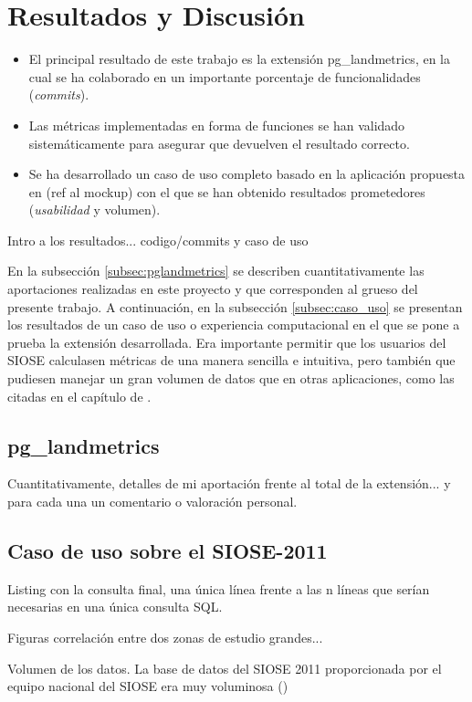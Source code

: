 \chapter{Resultados y Discusión}\label{chap:result}

\begin{graybox}
\begin{itemize}
\item El principal resultado de este trabajo es la extensión pg\_landmetrics, en la cual se ha colaborado en un importante porcentaje de funcionalidades (\textit{commits}).
\item Las métricas implementadas en forma de funciones se han validado sistemáticamente para asegurar que devuelven el resultado correcto.
\item Se ha desarrollado un caso de uso completo basado en la aplicación propuesta en (ref al mockup) con el que se han obtenido resultados prometedores (\textit{usabilidad} y volumen).
\end{itemize}
\end{graybox}

Intro a los resultados... codigo/commits y caso de uso

En la subsección \ref{subsec:pglandmetrics} se describen cuantitativamente las aportaciones realizadas en este proyecto y que corresponden al grueso del presente trabajo. A continuación, en la subsección \ref{subsec:caso_uso} se presentan los resultados de un caso de uso o experiencia computacional en el que se pone a prueba la extensión desarrollada. Era importante permitir que los usuarios del SIOSE calculasen métricas de una manera sencilla e intuitiva, pero también que pudiesen manejar un gran volumen de datos que en otras aplicaciones, como las citadas en el capítulo de .

\section{pg\_landmetrics \label{sec:pglandmetrics}}

Cuantitativamente, detalles de mi aportación frente al total de la extensión... y para cada una un comentario o valoración personal.


\section{Caso de uso sobre el SIOSE-2011 \label{sec:caso_uso}}


Listing con la consulta final, una única línea frente a las n líneas que serían necesarias en una única consulta SQL.

Figuras correlación entre dos zonas de estudio grandes...


Volumen de los datos. La base de datos del SIOSE 2011 proporcionada por el equipo nacional del SIOSE era muy voluminosa ()






